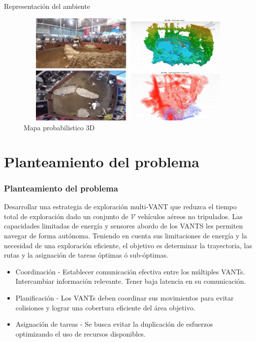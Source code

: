 \documentclass[
	11pt, %
	aspectratio=169, %
]{beamer}
\begin{document}
\begin{frame}{Representación del ambiente}

  \begin{figure}
    \centering
    \includegraphics[width=12cm, height=5.5cm]{octomaps}
    \caption[Caption for LOF]{Mapa probabilistico 3D\protect\footnotemark}
  \end{figure}
  
\end{frame}

\section{Planteamiento del problema}

\begin{frame}
  \frametitle{Planteamiento del problema}
  Desarrollar una estrategia de exploración multi-VANT que reduzca el tiempo total de exploración dado un conjunto de $\mathcal{V}$ vehículos aéreos no tripulados. Las capacidades limitadas de energía y sensores abordo de los VANTS les permiten navegar de forma autónoma. Teniendo en cuenta sus limitaciones de energía y la necesidad de una exploración eficiente, el objetivo es determinar la trayectoria, las rutas y la asignación de tareas óptimas ó sub-óptimas.
  \bigskip %
  \begin{itemize}
  \item<1-> Coordinación - Establecer comunicación efectiva entre los múltiples VANTs. Intercambiar información relevante. Tener baja latencia en su comunicación.
  \item<2-> Planificación - Los VANTs deben coordinar sus movimientos para evitar colisiones y lograr una cobertura eficiente del área objetivo.
  \item<3-> Asignación de tareas - Se busca evitar la duplicación de esfuerzos optimizando el uso de recursos disponibles.
  \end{itemize}
  
\end{frame}
\end{document}
